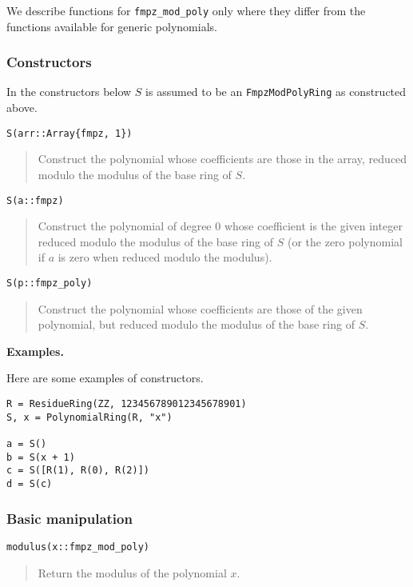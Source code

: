\documentclass[a4paper,10pt]{article}
\newcommand{\code}{\lstinline}
\newcommand{\desc}[1]{\vspace{-3mm}\begin{quote}#1\end{quote}}
\begin{document}
{{We describe functions for \code{fmpz_mod_poly} only where they differ from the functions
available for generic polynomials.

\subsubsection{Constructors}

In the constructors below $S$ is assumed to be an \code{FmpzModPolyRing} as constructed above.

\begin{lstlisting}
S(arr::Array{fmpz, 1})
\end{lstlisting}

\desc{Construct the polynomial whose coefficients are those in the array, reduced modulo the
modulus of the base ring of $S$.}

\begin{lstlisting}
S(a::fmpz)
\end{lstlisting}

\desc{Construct the polynomial of degree $0$ whose coefficient is the given integer reduced
modulo the modulus of the base ring of $S$ (or the zero polynomial if $a$ is zero when
reduced modulo the modulus).}

\begin{lstlisting}
S(p::fmpz_poly)
\end{lstlisting}

\desc{Construct the polynomial whose coefficients are those of the given polynomial, but
reduced modulo the modulus of the base ring of $S$.}

\textbf{Examples.}

Here are some examples of constructors.

\begin{lstlisting}
R = ResidueRing(ZZ, 123456789012345678901)
S, x = PolynomialRing(R, "x")

a = S()
b = S(x + 1)
c = S([R(1), R(0), R(2)])
d = S(c)
\end{lstlisting}

\subsubsection{Basic manipulation}

\begin{lstlisting}
modulus(x::fmpz_mod_poly)
\end{lstlisting}

\desc{Return the modulus of the polynomial $x$.}

}}
\end{document}
